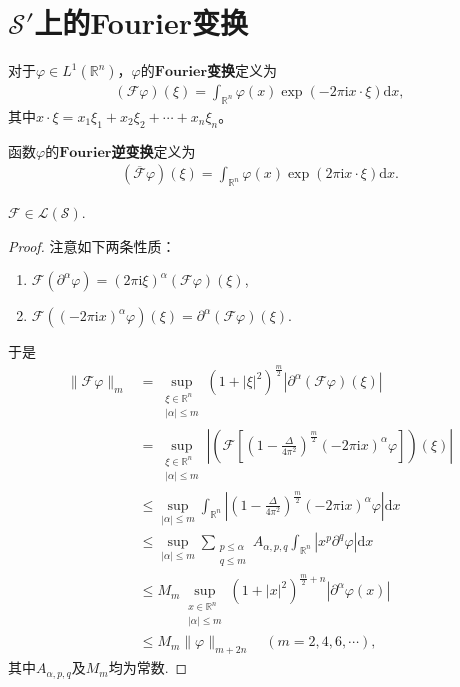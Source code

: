 \documentclass[../../main.tex]{subfiles}%
\begin{document}
\section{$\mathscr{S}'$上的Fourier变换}

\begin{definition}
对于$\varphi\in L^1(\mathbb{R}^n)$，$\varphi$的$\mathbf{Fourier}$\textbf{变换}定义为
\begin{align*}
(\mathscr{F}\varphi)(\xi)=\int_{\mathbb{R}^n}\varphi(x)\exp(-2\pi\mathrm{i}x\cdot\xi)\mathrm{d}x,
\end{align*}
其中$x\cdot\xi=x_1\xi_1+x_2\xi_2+\cdots+x_n\xi_n$。

函数$\varphi$的$\mathbf{Fourier}$\textbf{逆变换}定义为
\begin{align*}
(\overline{\mathscr{F}}\varphi)(\xi)=\int_{\mathbb{R}^n}\varphi(x)\exp(2\pi\mathrm{i}x\cdot\xi)\mathrm{d}x.
\end{align*}
\end{definition}

\begin{proposition}
$\mathscr{F}\in\mathscr{L}(\mathscr{S})$.
\end{proposition}
\begin{proof}

注意如下两条性质：
\begin{enumerate}[(1)]
\item $\mathscr{F}(\partial^\alpha\varphi)=(2\pi\mathrm{i}\xi)^\alpha(\mathscr{F}\varphi)(\xi)$,
\item $\mathscr{F}((-2\pi\mathrm{i}x)^\alpha\varphi)(\xi)=\partial^\alpha(\mathscr{F}\varphi)(\xi)$.
\end{enumerate}
于是
\begin{align*}
\|\mathscr{F}\varphi\|_m&=\sup_{\substack{\xi\in\mathbb{R}^n\\|\alpha|\leqslant m}}(1+|\xi|^2)^{\frac{m}{2}}|\partial^\alpha(\mathscr{F}\varphi)(\xi)|\\
&=\sup_{\substack{\xi\in\mathbb{R}^n\\|\alpha|\leqslant m}}\left|\left(\mathscr{F}\left[\left(1-\frac{\Delta}{4\pi^2}\right)^{\frac{m}{2}}(-2\pi\mathrm{i}x)^\alpha\varphi\right]\right)(\xi)\right|\\
&\leqslant\sup_{|\alpha|\leqslant m}\int_{\mathbb{R}^n}\left|\left(1-\frac{\Delta}{4\pi^2}\right)^{\frac{m}{2}}(-2\pi\mathrm{i}x)^\alpha\varphi\right|\mathrm{d}x\\
&\leqslant\sup_{|\alpha|\leqslant m}\sum\limits_{\substack{p\leqslant\alpha\\q\leqslant m}}A_{\alpha,p,q}\int_{\mathbb{R}^n}|x^p\partial^q\varphi|\mathrm{d}x\\
&\leqslant M_m\sup_{\substack{x\in\mathbb{R}^n\\|\alpha|\leqslant m}}(1+|x|^2)^{\frac{m}{2}+n}|\partial^\alpha\varphi(x)|\\
&\leqslant M_m\|\varphi\|_{m+2n}\quad(m=2,4,6,\cdots),
\end{align*}
其中$A_{\alpha,p,q}$及$M_m$均为常数.

\end{proof}
\end{document}
